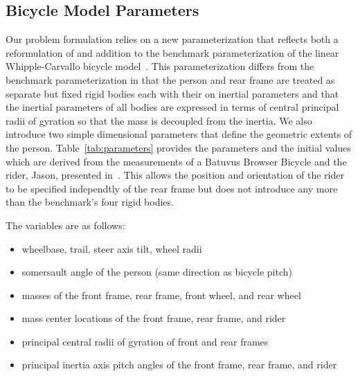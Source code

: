 \documentclass{bmd2019a}
\begin{document}
\subsection*{Bicycle Model Parameters}
%
Our problem formulation relies on a new parameterization that reflects both a
reformulation of and addition to the benchmark parameterization of the linear
Whipple-Carvallo bicycle model~\cite{Meijaard2007}. This parameterization
differs from the benchmark parameterization in that the person and rear frame
are treated as separate but fixed rigid bodies each with their on inertial
parameters and that the inertial parameters of all bodies are expressed in
terms of central principal radii of gyration so that the mass is decoupled from
the inertia. We also introduce two simple dimensional parameters that define
the geometric extents of the person. Table~\ref{tab:parameters} provides the
parameters and the initial values which are derived from the measurements of a
Batuvus Browser Bicycle and the rider, Jason, presented in~\cite{Moore2012}.
This allows the position and orientation of the rider to be specified
independtly of the rear frame but does not introduce any more than the
benchmark's four rigid bodies.

The variables are as follows:
%
\begin{itemize}
  \item wheelbase, trail, steer axis tilt, wheel radii
  \item somersault angle of the person (same direction as bicycle pitch)
  \item masses of the front frame, rear frame, front wheel, and rear wheel
  \item mass center locations of the front frame, rear frame, and rider
  \item principal central radii of gyration of front and rear frames
  \item principal inertia axis pitch angles of the front frame, rear frame, and rider
\end{itemize}
\end{document}
